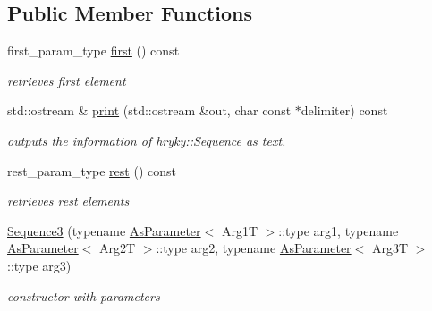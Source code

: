 \subsection*{Public Member Functions}
\begin{DoxyCompactItemize}
\item 
\hypertarget{classhryky_1_1_sequence_a881ed830dc76f92d29fe8feea122339b}{first\-\_\-param\-\_\-type \hyperlink{classhryky_1_1_sequence_a881ed830dc76f92d29fe8feea122339b}{first} () const}\label{classhryky_1_1_sequence_a881ed830dc76f92d29fe8feea122339b}

\begin{DoxyCompactList}\small\item\em retrieves first element \end{DoxyCompactList}\item 
\hypertarget{classhryky_1_1_sequence_a8443de2eb918764c345a86b40dd888db}{std\-::ostream \& \hyperlink{classhryky_1_1_sequence_a8443de2eb918764c345a86b40dd888db}{print} (std\-::ostream \&out, char const $\ast$delimiter) const}\label{classhryky_1_1_sequence_a8443de2eb918764c345a86b40dd888db}

\begin{DoxyCompactList}\small\item\em outputs the information of \hyperlink{classhryky_1_1_sequence}{hryky\-::\-Sequence} as text. \end{DoxyCompactList}\item 
\hypertarget{classhryky_1_1_sequence_a11e616cd4cfe41751bbaa350fca3dcb1}{rest\-\_\-param\-\_\-type \hyperlink{classhryky_1_1_sequence_a11e616cd4cfe41751bbaa350fca3dcb1}{rest} () const}\label{classhryky_1_1_sequence_a11e616cd4cfe41751bbaa350fca3dcb1}

\begin{DoxyCompactList}\small\item\em retrieves rest elements \end{DoxyCompactList}\item 
\hypertarget{classhryky_1_1_sequence3_a90abb731407f77fd27ee683a325ac863}{\hyperlink{classhryky_1_1_sequence3_a90abb731407f77fd27ee683a325ac863}{Sequence3} (typename \hyperlink{classhryky_1_1_as_parameter}{As\-Parameter}$<$ Arg1\-T $>$\-::type arg1, typename \hyperlink{classhryky_1_1_as_parameter}{As\-Parameter}$<$ Arg2\-T $>$\-::type arg2, typename \hyperlink{classhryky_1_1_as_parameter}{As\-Parameter}$<$ Arg3\-T $>$\-::type arg3)}\label{classhryky_1_1_sequence3_a90abb731407f77fd27ee683a325ac863}

\begin{DoxyCompactList}\small\item\em constructor with parameters \end{DoxyCompactList}\end{DoxyCompactItemize}


